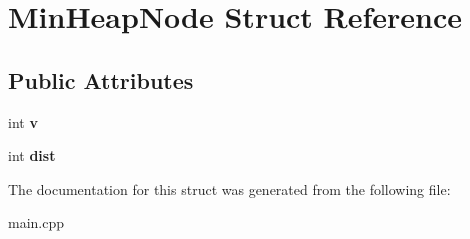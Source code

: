 \hypertarget{struct_min_heap_node}{}\section{Min\+Heap\+Node Struct Reference}
\label{struct_min_heap_node}
\subsection*{Public Attributes}
\begin{DoxyCompactItemize}
\item 
\mbox{\label{struct_min_heap_node_ae8e924bbd85d4fc80f1f841bc7d46cdd}} 
int {\bfseries v}
\item 
\mbox{\label{struct_min_heap_node_ab6e5caa74582a330e2106ae442bf0c5d}} 
int {\bfseries dist}
\end{DoxyCompactItemize}


The documentation for this struct was generated from the following file\+:\begin{DoxyCompactItemize}
\item 
main.\+cpp\end{DoxyCompactItemize}
